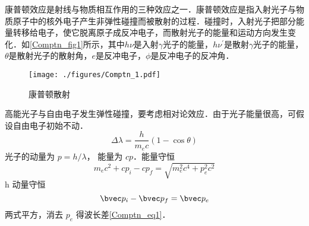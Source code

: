 
康普顿效应是射线与物质相互作用的三种效应之一．康普顿效应是指入射光子与物质原子中的核外电子产生非弹性碰撞而被散射的过程．碰撞时，入射光子把部分能量转移给电子，使它脱离原子成反冲电子，而散射光子的能量和运动方向发生变化．如\autoref{Comptn_fig1}所示，其中$h\nu$是入射$\gamma$光子的能量，$h\nu^\prime$是散射$\gamma$光子的能量，$\theta$是散射光子的散射角，$e$是反冲电子，$\phi$是反冲电子的反冲角．
\begin{figure}[ht]
\centering
\texttt{[image: ./figures/Comptn\_1.pdf]}
\caption{康普顿散射} \label{Comptn_fig1}
\end{figure}
高能光子与自由电子发生弹性碰撞，要考虑相对论效应．由于光子能量很高，可假设自由电子初始不动．
\begin{equation}\label{Comptn_eq1}
\Delta \lambda  = \frac{h}{m_e c}(1 - \cos\theta )
\end{equation}           
光子的动量为 $p = h/\lambda$， 能量为 $cp$．能量守恒
\begin{equation}
m_e c^2 + c p_i - c p_f = \sqrt{m_e^2 c^4 + p_e^2 c^2}
\end{equation} h
动量守恒
\begin{equation}
\bvec p_i - \bvec p_f = \bvec p_e
\end{equation}
两式平方，消去 $p_e$ 得波长差\autoref{Comptn_eq1}． 
 